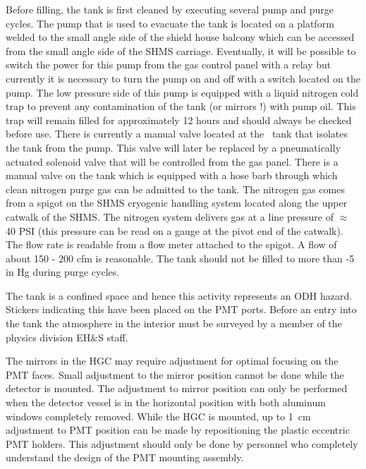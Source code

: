 {{Before filling, the tank is first cleaned by executing several pump
and purge cycles. The pump that is used to evacuate the tank is located on a
platform welded to the small angle side of the shield house balcony
which can be accessed from the small angle side of the SHMS carriage.
Eventually, it will be possible to switch the power for this pump
from the gas control panel with a relay but currently it
is necessary to turn the pump on and off with a switch located on the pump.
The low pressure side of this pump is equipped with a liquid nitrogen
cold trap to prevent any contamination of the tank (or mirrors !)
with pump oil. This trap will remain filled for approximately
12 hours and should always be checked before use. There is currently
a manual valve located at the \Cerenkov\ tank that isolates the tank from
the pump.  This valve will later be replaced by a pneumatically actuated
solenoid valve that will be controlled from the gas panel.
There is a manual valve on the tank which is equipped with a hose
barb through which clean nitrogen purge gas can be admitted to the tank.
The nitrogen gas comes from a spigot on the SHMS cryogenic handling system
located along the upper catwalk of the SHMS. The nitrogen system
delivers gas at a line pressure of $\approx$ 40 PSI (this pressure can
be read on a gauge at the pivot end of the catwalk). The flow
rate is readable from a flow meter attached to the spigot. A flow of
about 150 - 200 cfm is reasonable. The tank should not be filled to
more than -5 in Hg during purge cycles.

}



The tank is a confined space and hence this activity represents an ODH
hazard. Stickers indicating this have been placed on the PMT
ports. Before an entry into the tank the atmosphere in the interior
must be surveyed by a member of the physics division EH$\&$S staff.

The mirrors in the HGC may require adjustment for optimal focusing on
the PMT faces. Small adjustment to the mirror position cannot be done
while the detector is mounted. The adjustment to mirror position can
only be performed when the detector vessel is in the horizontal
position with both aluminum windows completely removed. While the HGC
is mounted, up to 1~cm adjustment to PMT position can be made by
repositioning the plastic eccentric PMT holders. This adjustment
should only be done by personnel who completely understand the design
of the PMT mounting assembly.






}
